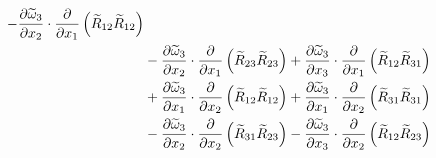 \begin{equation}
{\begin{split}
                    -\pdv{\widetilde{\omega}_{3}}{x_{2}}\cdot\pdv{}{x_{1}}\left(\widetilde{R}_{12}\widetilde{R}_{12}\right)    \\
                &   -\pdv{\widetilde{\omega}_{3}}{x_{2}}\cdot\pdv{}{x_{1}}\left(\widetilde{R}_{23}\widetilde{R}_{23}\right)    
                    +\pdv{\widetilde{\omega}_{3}}{x_{3}}\cdot\pdv{}{x_{1}}\left(\widetilde{R}_{12}\widetilde{R}_{31}\right)    \\
                &   +\pdv{\widetilde{\omega}_{3}}{x_{1}}\cdot\pdv{}{x_{2}}\left(\widetilde{R}_{12}\widetilde{R}_{12}\right)    
                    +\pdv{\widetilde{\omega}_{3}}{x_{1}}\cdot\pdv{}{x_{2}}\left(\widetilde{R}_{31}\widetilde{R}_{31}\right)    \\
                &   -\pdv{\widetilde{\omega}_{3}}{x_{2}}\cdot\pdv{}{x_{2}}\left(\widetilde{R}_{31}\widetilde{R}_{23}\right)    
                    -\pdv{\widetilde{\omega}_{3}}{x_{3}}\cdot\pdv{}{x_{2}}\left(\widetilde{R}_{12}\widetilde{R}_{23}\right)    
        \end{split}
        }
\end{equation}
